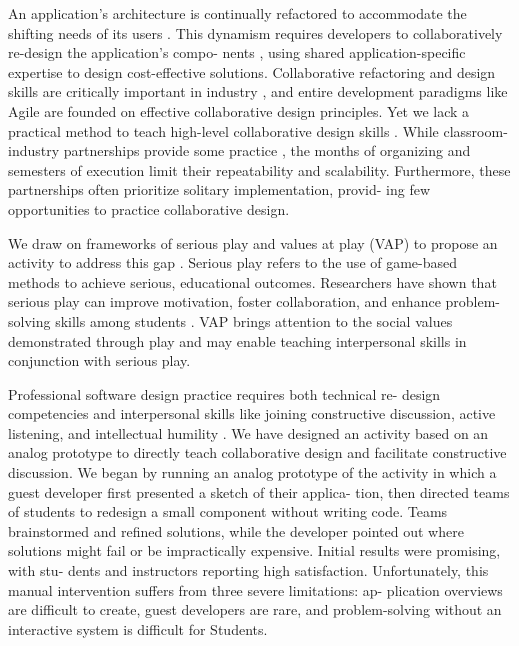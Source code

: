 An application’s architecture is continually refactored to accommodate the shifting needs of its users \cite{}. This dynamism requires
developers to collaboratively re-design the application’s compo-
nents \cite{}, using shared application-specific expertise to design
cost-effective solutions. Collaborative refactoring and design skills
are critically important in industry \cite{}, and entire development
paradigms like Agile are founded on effective collaborative design
principles.
Yet we lack a practical method to teach high-level collaborative
design skills \cite{}. While classroom-industry partnerships
provide some practice \cite{}, the months of organizing and semesters
of execution limit their repeatability and scalability. Furthermore,
these partnerships often prioritize solitary implementation, provid-
ing few opportunities to practice collaborative design.



We draw on frameworks of serious play and values at play (VAP)
to propose an activity to address this gap \cite{}. Serious play refers
to the use of game-based methods to achieve serious, educational
outcomes. Researchers have shown that serious play can improve
motivation, foster collaboration, and enhance problem-solving skills
among students \cite{}. VAP brings attention to the social values
demonstrated through play and may enable teaching interpersonal
skills in conjunction with serious play.

Professional software design practice requires both technical re-
design competencies and interpersonal skills like joining constructive discussion, active listening, and intellectual humility \cite{}. We
have designed an activity based on an analog prototype to directly
teach collaborative design and facilitate constructive discussion.
We began by running an analog prototype of the activity in
which a guest developer first presented a sketch of their applica-
tion, then directed teams of students to redesign a small component
without writing code. Teams brainstormed and refined solutions,
while the developer pointed out where solutions might fail or be
impractically expensive. Initial results were promising, with stu-
dents and instructors reporting high satisfaction. Unfortunately,
this manual intervention suffers from three severe limitations: ap-
plication overviews are difficult to create, guest developers are rare,
and problem-solving without an interactive system is difficult for
Students.

